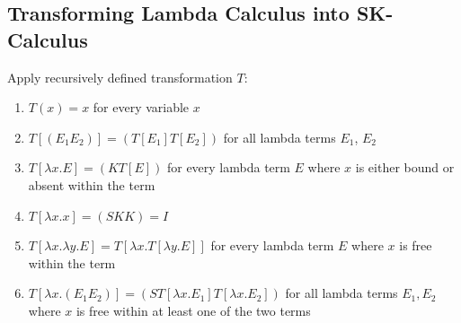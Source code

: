 \subsection*{Transforming Lambda Calculus into SK-Calculus}
Apply recursively defined transformation $T$:
\begin{enumerate}
    \item $T(x) = x$ for every variable $x$
    \item $T[(E_1E_2)] = (T[E_1]T[E_2])$ for all lambda terms $E_1$, $E_2$
    \item $T[\lambda x.E] = (KT[E])$ for every lambda term $E$ where $x$ is either bound or absent within the term
    \item $T[\lambda x.x] =  (SKK) = I$
    \item $T[\lambda x.\lambda y.E] = T[\lambda x.T[\lambda y.E]]$ for every lambda term $E$ where $x$ is free within the term
    \item $T[\lambda x.(E_1E_2)] = (ST[\lambda x.E_1]T[\lambda x.E_2])$ for all lambda terms $E_1, E_2$ where $x$ is free within at least one of the two terms
\end{enumerate}

